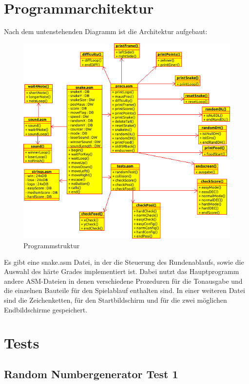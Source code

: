 \documentclass[a4paper,10pt]{article}
\begin{document}
	\section{Programmarchitektur}
		Nach dem untenstehenden Diagramm ist die Architektur aufgebaut: \\
		\begin{figure}[h]
			\centering
			\includegraphics[width=1\textwidth]{Klassendiagramm}
			\caption{Programmstruktur}
			\label{UML}
		\end{figure}
		
		Es gibt eine snake.asm Datei, in der die Steuerung des Rundenablaufs, 
		sowie die Auswahl des härte Grades implementiert ist. Dabei nutzt das 
		Hauptprogramm andere ASM-Dateien in denen verschiedene Prozeduren für 
		die Tonausgabe und die einzelnen Bauteile für den Spielablauf enthalten 
		sind. In einer weiteren Datei sind die Zeichenketten, für den 
		Startbildschirm und für die zwei möglichen Endbildschirme gespeichert.\\
		\newpage
	\section{Tests}
		\subsection{Random Numbergenerator Test 1}
			
\end{document}
